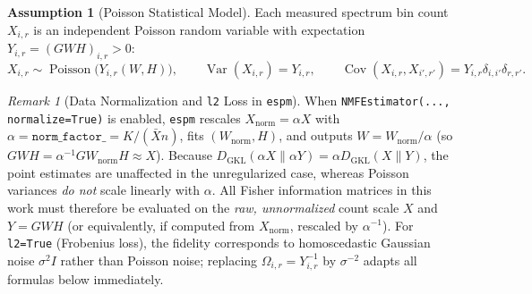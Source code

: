 \documentclass[11pt,a4paper]{article}
\theoremstyle{plain}
\theoremstyle{definition}
\newtheorem{assumption}[theorem]{Assumption}
\theoremstyle{remark}
\newtheorem{remark}[theorem]{Remark}
\newcommand{\Cov}{\operatorname{Cov}}
\begin{document}
\begin{assumption}[Poisson Statistical Model]
\label{assump:poisson}
Each measured spectrum bin count $X_{i,r}$ is an independent Poisson random variable with expectation $Y_{i,r} = (GWH)_{i,r} > 0$:
\begin{equation}
X_{i,r} \sim \operatorname{Poisson}\!\big(Y_{i,r}(W,H)\big), \qquad \operatorname{Var}(X_{i,r}) = Y_{i,r}, \qquad \Cov(X_{i,r}, X_{i',r'}) = Y_{i,r}\delta_{i,i'}\delta_{r,r'}.
\end{equation}
\end{assumption}

\begin{remark}[Data Normalization and \texttt{l2} Loss in \texttt{espm}]
When \texttt{NMFEstimator(..., normalize=True)} is enabled, \texttt{espm} rescales $X_{\text{norm}} = \alpha X$ with $\alpha = \texttt{norm\_factor\_} = K / (\bar{X} n)$, fits $(W_{\text{norm}}, H)$, and outputs $W = W_{\text{norm}}/\alpha$ (so $G W H = \alpha^{-1} G W_{\text{norm}} H \approx X$). Because $D_{\text{GKL}}(\alpha X \| \alpha Y) = \alpha D_{\text{GKL}}(X \| Y)$, the point estimates are unaffected in the unregularized case, whereas Poisson variances \emph{do not} scale linearly with $\alpha$. All Fisher information matrices in this work must therefore be evaluated on the \emph{raw, unnormalized} count scale $X$ and $Y = GWH$ (or equivalently, if computed from $X_{\text{norm}}$, rescaled by $\alpha^{-1}$). For \texttt{l2=True} (Frobenius loss), the fidelity corresponds to homoscedastic Gaussian noise $\sigma^2 I$ rather than Poisson noise; replacing $\Omega_{i,r} = Y_{i,r}^{-1}$ by $\sigma^{-2}$ adapts all formulas below immediately.
\end{remark}
\end{document}

